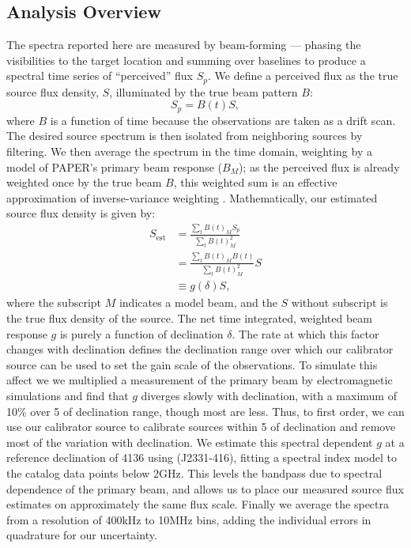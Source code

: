 \documentclass[preprint]{aastex}
\begin{document}
\subsection{Analysis Overview}
\label{sec:data_overview}
The spectra reported here are measured by beam-forming --- phasing the visibilities to
the target location and summing over baselines to produce a spectral time series of ``perceived'' flux $S_p$.
We define a perceived flux as the true source flux density, $S$, illuminated by the true beam pattern $B$:
\begin{equation}
S_p=B(t)S,
\end{equation}
where $B$ is a function of time because the observations are taken as a drift
scan.
The desired source spectrum is then isolated
from neighboring sources by filtering.%
We then average the spectrum in the time domain,
weighting by a model of PAPER's primary beam response ($B_M$); as the perceived flux is already weighted once by the true beam $B$, this weighted sum is an effective approximation of inverse-variance weighting \citep{Pober:2012p8800}.
Mathematically, our estimated source flux density is given by: 
\begin{align}
S_\textrm{est} &= \frac{\sum_t B(t)_M S_p}{\sum_t B(t)^2_M} \nonumber \\ 
&= \frac{\sum_t B(t)_M B(t)}{\sum_t B(t)^2_M} S  \nonumber \\
&\equiv g(\delta) S  \label{eq:g},
\end{align}
where the subscript $M$ indicates a model beam, and the $S$ without subscript is the true flux density of the source.
The net time integrated, weighted beam response $g$ is purely a function of declination $\delta$.  The rate at which this factor
changes with declination defines the declination range over which our calibrator source can be used to set the gain scale of the observations.
To simulate this affect we we multiplied a measurement of the primary beam \citep{Pober:2012p8800}
by electromagnetic simulations \citep{Parsons:2010p6757} and find that $g$ 
diverges slowly with declination, with a maximum of 10\% over 5\arcdeg{} of declination range, though most are less. %
Thus, to first order,
we can use our calibrator source to calibrate sources within 5\arcdeg{} of declination and remove most of the variation with declination.
We estimate this spectral dependent $g$ at a reference declination of 41\arcdeg{}36\arcmin{} using (J2331-416), fitting a spectral index model to the
 catalog data points below 2GHz. This levels the bandpass due to spectral dependence of the primary beam, and allows us to place our measured source flux
estimates
on approximately the same flux scale.  
 Finally we average the spectra from a resolution of 400kHz to 10MHz bins, adding the individual errors in quadrature
 for our uncertainty.
 
\end{document}
